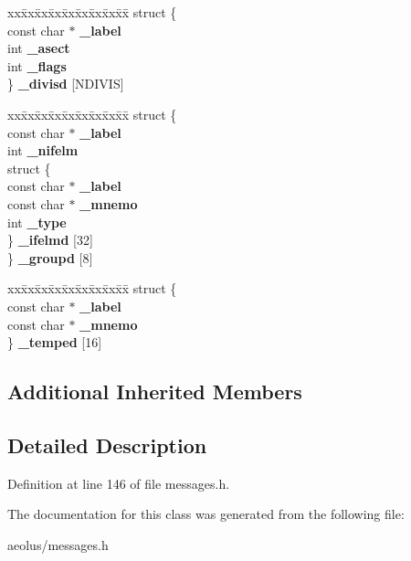 \begin{DoxyCompactItemize}
\begin{tabbing}
\end{tabbing}\item 
\mbox{\label{class_m__ifc__init_afb855376b7dca69884e6f08d6c26f8fe}} 
\begin{tabbing}
xx\=xx\=xx\=xx\=xx\=xx\=xx\=xx\=xx\=\kill
struct \{\\
\>const char $\ast$ {\bfseries \_label}\\
\>int {\bfseries \_asect}\\
\>int {\bfseries \_flags}\\
\} {\bfseries \_divisd} \mbox{[}NDIVIS\mbox{]}\\

\end{tabbing}\item 
\mbox{\label{class_m__ifc__init_a9c720f313a30af2545af6010ded50a99}} 
\begin{tabbing}
xx\=xx\=xx\=xx\=xx\=xx\=xx\=xx\=xx\=\kill
struct \{\\
\>const char $\ast$ {\bfseries \_label}\\
\>int {\bfseries \_nifelm}\\
\>struct \{\\
\>\>const char $\ast$ {\bfseries \_label}\\
\>\>const char $\ast$ {\bfseries \_mnemo}\\
\>\>int {\bfseries \_type}\\
\>\} {\bfseries \_ifelmd} \mbox{[}32\mbox{]}\\
\} {\bfseries \_groupd} \mbox{[}8\mbox{]}\\

\end{tabbing}\item 
\mbox{\label{class_m__ifc__init_a3f410ecdac142ee9f4e4b02b89f251b1}} 
\begin{tabbing}
xx\=xx\=xx\=xx\=xx\=xx\=xx\=xx\=xx\=\kill
struct \{\\
\>const char $\ast$ {\bfseries \_label}\\
\>const char $\ast$ {\bfseries \_mnemo}\\
\} {\bfseries \_temped} \mbox{[}16\mbox{]}\\

\end{tabbing}\end{DoxyCompactItemize}
\subsection*{Additional Inherited Members}


\subsection{Detailed Description}


Definition at line 146 of file messages.\+h.



The documentation for this class was generated from the following file\+:\begin{DoxyCompactItemize}
\item 
aeolus/messages.\+h\end{DoxyCompactItemize}
